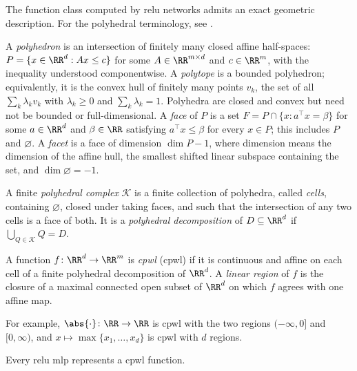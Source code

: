 The function class computed by \ac{relu} networks admits an exact geometric description. For the polyhedral terminology, see \textcite[Chapters~1--2 and Section~5.1]{Ziegler1995}.

\begin{definition}\label{def:polyhedron_polytope}
A \emph{polyhedron} is an intersection of finitely many closed affine half-spaces: $P=\{x\in\RR^d:Ax\le c\}$ for some $A\in\RR^{m\times d}$ and $c\in\RR^m$, with the inequality understood componentwise. A \emph{polytope} is a bounded polyhedron; equivalently, it is the convex hull of finitely many points $v_k$, the set of all $\sum_k\lambda_kv_k$ with $\lambda_k\ge0$ and $\sum_k\lambda_k=1$. Polyhedra are closed and convex but need not be bounded or full-dimensional.
A \emph{face} of $P$ is a set $F=P\cap\{x:a^\top x=\beta\}$ for some $a\in\RR^d$ and $\beta\in\RR$ satisfying $a^\top x\le\beta$ for every $x\in P$; this includes $P$ and $\varnothing$. A \emph{facet} is a face of dimension $\dim P-1$, where dimension means the dimension of the affine hull, the smallest shifted linear subspace containing the set, and $\dim\varnothing=-1$.
\end{definition}

\begin{definition}\label{def:polyhedral_complex}
A finite \emph{polyhedral complex} $\mathcal K$ is a finite collection of polyhedra, called \emph{cells}, containing $\varnothing$, closed under taking faces, and such that the intersection of any two cells is a face of both. It is a \emph{polyhedral decomposition} of $D\subseteq\RR^d$ if $\bigcup_{Q\in\mathcal K}Q=D$.
\end{definition}

\begin{definition}\label{def:cpwl}
A function $f \colon \RR^{d} \to \RR^{m}$ is \emph{\acl{cpwl}} (\acs{cpwl}) if it is continuous and affine on each cell of a finite polyhedral decomposition of $\RR^d$. A \emph{linear region} of $f$ is the closure of a maximal connected open subset of $\RR^d$ on which $f$ agrees with one affine map.
\end{definition}

For example, $\abs{\cdot} \colon \RR \to \RR$ is \ac{cpwl} with the two regions $(-\infty, 0]$ and $[0, \infty)$, and $x \mapsto \max\{x_1, \ldots, x_d\}$ is \ac{cpwl} with $d$ regions.

\begin{observation}\label{obs:relu_is_cpwl}
Every \ac{relu} \ac{mlp} represents a \ac{cpwl} function.\end{observation}

